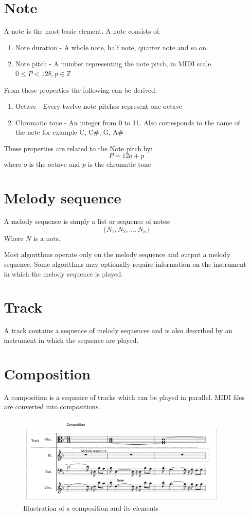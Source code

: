 \section{Note}
A note is the most basic element. A note consists of:
\begin{enumerate}
\item Note duration - A whole note, half note, quarter note and so on.
\item Note pitch - A number representing the note pitch, in MIDI scale. $0 \leq P < 128, p \in \mathbb{Z}$
\end{enumerate}

From these properties the following can be derived:
\begin{enumerate}
\item Octave - Every twelve note pitches represent one octave
\item Chromatic tone - An integer from 0 to 11. Also corresponds to the name of the note for example C, C\#, G, A\#
\end{enumerate}
These properties are related to the Note pitch by:
\[P = 12o + p \]
where $o$ is the octave and $p$ is the chromatic tone

\section{Melody sequence}
A melody sequence is simply a list or sequence of notes:
\[\{N_1, N_2, \ldots, N_n\} \]
Where $N$ is a note.

Most algorithms operate only on the melody sequence and output a melody sequence. Some algorithms may optionally require information on the instrument in which the melody sequence is played.

\section{Track}
A track contains a sequence of melody sequences and is also described by an instrument in which the sequence are played.

\section{Composition}
A composition is a sequence of tracks which can be played in parallel. 
MIDI files are converted into compositions.

\begin{figure}
\centerline{\includegraphics[width=400px]{../images/composition_illustration.pdf}}
\caption{Illustration of a composition and its elements}
\label{ims:compillu}
\end{figure}

